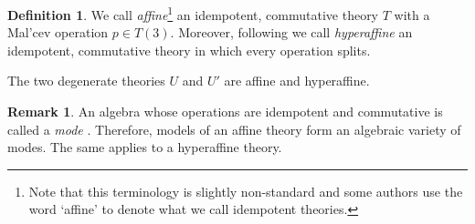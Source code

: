 \documentclass{amsart}
\numberwithin{equation}{section}
\theoremstyle{plain}
\theoremstyle{definition}
\newtheorem{definition}[theorem]{Definition}
\newtheorem{remark}[theorem]{Remark}
\begin{document}

\begin{definition}
  \label{def:hyper-affine}
  We call \emph{affine}\footnote{Note that this terminology is slightly non-standard and some authors use the word `affine' to denote what we call idempotent theories.} an idempotent, commutative theory $T$ with a Mal'cev operation $p \in T(3)$.  
  Moreover, following \cite[Section 4]{J90} we call \emph{hyperaffine} an idempotent, commutative theory in which every operation splits.
\end{definition}

The two degenerate theories $U$ and $U'$ are affine and hyperaffine.

\begin{remark}
  An algebra whose operations are idempotent and commutative is called a \emph{mode} \cite{RS02}. 
  Therefore, models of an affine theory form an algebraic variety of modes. 
  The same applies to a hyperaffine theory. 
\end{remark}
\end{document}
